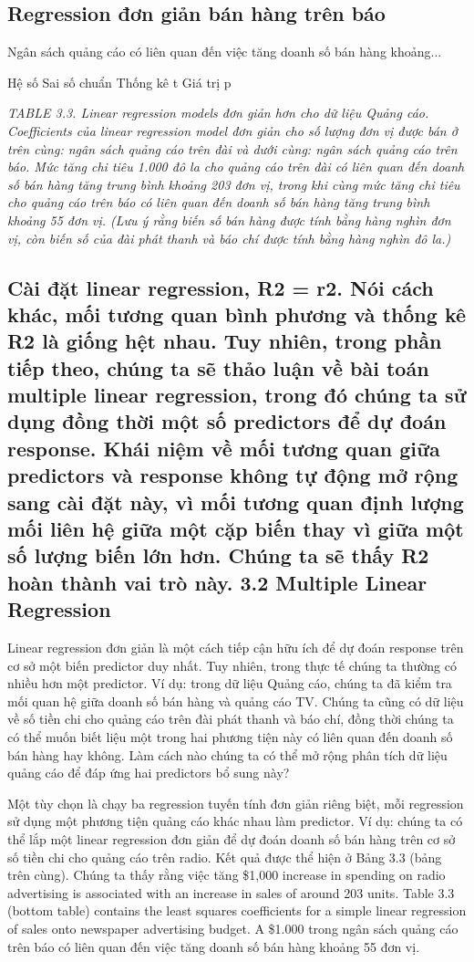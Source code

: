 \subsection{Regression đơn giản bán hàng trên báo}

Ngân sách quảng cáo có liên quan đến việc tăng doanh số bán hàng khoảng...

Hệ số Sai số chuẩn Thống kê t Giá trị p

\noindent\textit{TABLE 3.3. Linear regression models đơn giản hơn cho dữ liệu Quảng cáo. Coefficients của linear regression model đơn giản cho số lượng đơn vị được bán ở trên cùng: ngân sách quảng cáo trên đài và dưới cùng: ngân sách quảng cáo trên báo. Mức tăng chi tiêu 1.000 đô la cho quảng cáo trên đài có liên quan đến doanh số bán hàng tăng trung bình khoảng 203 đơn vị, trong khi cùng mức tăng chi tiêu cho quảng cáo trên báo có liên quan đến doanh số bán hàng tăng trung bình khoảng 55 đơn vị. (Lưu ý rằng biến số bán hàng được tính bằng hàng nghìn đơn vị, còn biến số của đài phát thanh và báo chí được tính bằng hàng nghìn đô la.)}

\subsection{Cài đặt linear regression, R2 = r2. Nói cách khác, mối tương quan bình phương và thống kê R2 là giống hệt nhau. Tuy nhiên, trong phần tiếp theo, chúng ta sẽ thảo luận về bài toán multiple linear regression, trong đó chúng ta sử dụng đồng thời một số predictors để dự đoán response. Khái niệm về mối tương quan giữa predictors và response không tự động mở rộng sang cài đặt này, vì mối tương quan định lượng mối liên hệ giữa một cặp biến thay vì giữa một số lượng biến lớn hơn. Chúng ta sẽ thấy R2 hoàn thành vai trò này. 3.2 Multiple Linear Regression}

Linear regression đơn giản là một cách tiếp cận hữu ích để dự đoán response trên cơ sở một biến predictor duy nhất. Tuy nhiên, trong thực tế chúng ta thường có nhiều hơn một predictor. Ví dụ: trong dữ liệu Quảng cáo, chúng ta đã kiểm tra mối quan hệ giữa doanh số bán hàng và quảng cáo TV. Chúng ta cũng có dữ liệu về số tiền chi cho quảng cáo trên đài phát thanh và báo chí, đồng thời chúng ta có thể muốn biết liệu một trong hai phương tiện này có liên quan đến doanh số bán hàng hay không. Làm cách nào chúng ta có thể mở rộng phân tích dữ liệu quảng cáo để đáp ứng hai predictors bổ sung này?

Một tùy chọn là chạy ba regression tuyến tính đơn giản riêng biệt, mỗi regression sử dụng một phương tiện quảng cáo khác nhau làm predictor. Ví dụ: chúng ta có thể lắp một linear regression đơn giản để dự đoán doanh số bán hàng trên cơ sở số tiền chi cho quảng cáo trên radio. Kết quả được thể hiện ở Bảng 3.3 (bảng trên cùng). Chúng ta thấy rằng việc tăng \$1,000 increase in spending on radio advertising is associated with an increase in sales of around 203 units. Table 3.3 (bottom table) contains the least squares coefficients for a simple linear regression of sales onto newspaper advertising budget. A \$1.000 trong ngân sách quảng cáo trên báo có liên quan đến việc tăng doanh số bán hàng khoảng 55 đơn vị.

